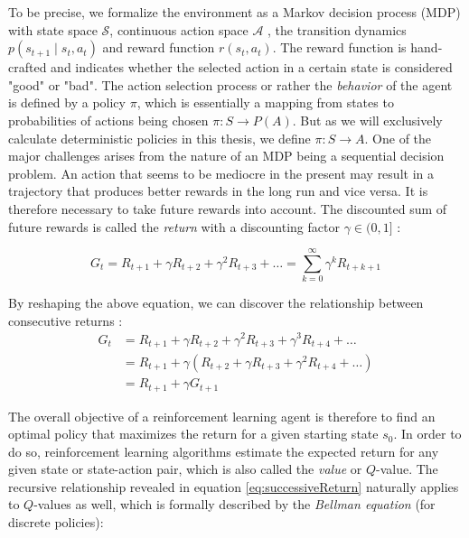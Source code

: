 To be precise, we formalize the environment as a Markov decision process (MDP) with state space $\mathcal{S}$, continuous action space $\mathcal{A}$ , the transition dynamics $p(s_{t+1} \mid s_t, a_t)$ and reward function $r(s_t, a_t)$. The reward function is hand-crafted and indicates whether the selected action in a certain state is considered "good" or "bad". The action selection process or rather the \textit{behavior} of the agent is defined by a policy $\pi$, which is essentially a mapping from states to probabilities of actions being chosen $\pi: S \rightarrow P(A)$. But as we will exclusively calculate deterministic policies in this thesis, we define $\pi: S \rightarrow A$.
\newpage
One of the major challenges arises from the nature of an MDP being a sequential decision problem. An action that seems to be mediocre in the present may result in a trajectory that produces better rewards in the long run and vice versa. It is therefore necessary to take future rewards into account. The discounted sum of future rewards is called the \textit{return} with a discounting factor $\gamma \in (0,1]$  \cite[p.55]{Sutton1998}:

\begin{equation}\label{eq:discountedReturn}
    G_t = R_{t+1} + \gamma R_{t+2} + \gamma^2 R_{t+3} + \dots  = \sum_{k=0}^\infty{\gamma^k R_{t+k+1}}
\end{equation}

By reshaping the above equation, we can discover the relationship between consecutive returns \cite[p.55]{Sutton1998}:
\begin{equation}\label{eq:successiveReturn}
    \begin{aligned}
    G_t &= R_{t+1} + \gamma R_{t+2} + \gamma^2 R_{t+3} + \gamma^3 R_{t+4} + \dots \\
    &= R_{t+1} + \gamma (R_{t+2} + \gamma R_{t+3} + \gamma^2 R_{t+4} + \dots)  \\
   & = R_{t+1} + \gamma G_{t+1}
    \end{aligned}
\end{equation}

The overall objective of a reinforcement learning agent is therefore to find an optimal policy that maximizes the return for a given starting state $s_0$. In order to do so, reinforcement learning algorithms estimate the expected return for any given state or state-action pair, which is also called the \textit{value} or $Q$-value. The recursive relationship revealed in equation \ref{eq:successiveReturn} naturally applies to $Q$-values as well, which is formally described by the \textit{Bellman equation} (for discrete policies):


